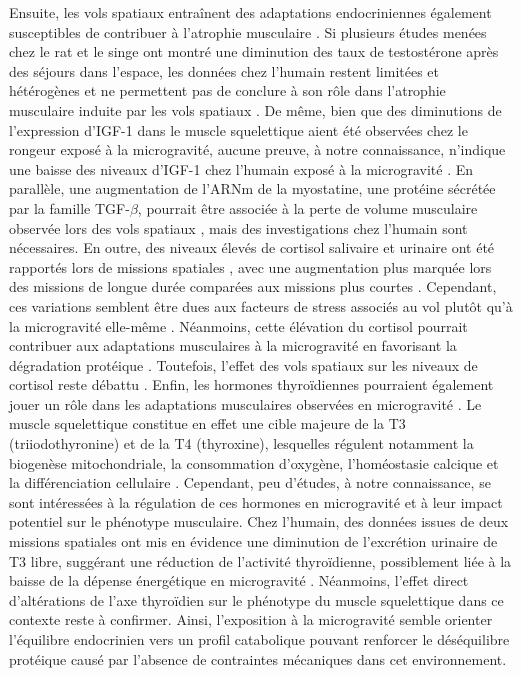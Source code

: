 \documentclass[11pt]{report}
\begin{document}
Ensuite, les vols spatiaux entraînent des adaptations endocriniennes également susceptibles de contribuer à l'atrophie musculaire \parencite{lee_factors_2022}. Si plusieurs études menées chez le rat et le singe ont montré une diminution des taux de testostérone après des séjours dans l'espace, les données chez l'humain restent limitées et hétérogènes et ne permettent pas de conclure à son rôle dans l'atrophie musculaire induite par les vols spatiaux \parencite{lee_factors_2022,strollo_aging-like_2021}. De même, bien que des diminutions de l'expression d'IGF-1 dans le muscle squelettique aient été observées chez le rongeur exposé à la microgravité, aucune preuve, à notre connaissance, n'indique une baisse des niveaux d'IGF-1 chez l'humain exposé à la microgravité \parencite{lee_factors_2022,juhl_update_2021}. En parallèle, une augmentation de l'ARNm de la myostatine, une protéine sécrétée par la famille TGF-$\beta$, pourrait être associée à la perte de volume musculaire observée lors des vols spatiaux \parencite{liu_mechanisms_2024}, mais des investigations chez l'humain sont nécessaires. En outre, des niveaux élevés de cortisol salivaire et urinaire ont été rapportés lors de missions spatiales \parencite{MiriamCapri2025Sep}, avec une augmentation plus marquée lors des missions de longue durée comparées aux missions plus courtes \parencite{Stowe2011Jun}. Cependant, ces variations semblent être dues aux facteurs de stress associés au vol plutôt qu'à la microgravité elle-même \parencite{strollo_aging-like_2021}. Néanmoins, cette élévation du cortisol pourrait contribuer aux adaptations musculaires à la microgravité en favorisant la dégradation protéique \parencite{Sato2017Jan}. Toutefois, l'effet des vols spatiaux sur les niveaux de cortisol reste débattu \parencite{lee_factors_2022}. Enfin, les hormones thyroïdiennes pourraient également jouer un rôle dans les adaptations musculaires observées en microgravité \parencite{lee_factors_2022}. Le muscle squelettique constitue en effet une cible majeure de la T3 (triiodothyronine) et de la T4 (thyroxine), lesquelles régulent notamment la biogenèse mitochondriale, la consommation d'oxygène, l'homéostasie calcique et la différenciation cellulaire \parencite{Salvatore2014Apr,Lombardi2015Aug,lee_factors_2022}. Cependant, peu d'études, à notre connaissance, se sont intéressées à la régulation de ces hormones en microgravité et à leur impact potentiel sur le phénotype musculaire. Chez l'humain, des données issues de deux missions spatiales ont mis en évidence une diminution de l'excrétion urinaire de T3 libre, suggérant une réduction de l'activité thyroïdienne, possiblement liée à la baisse de la dépense énergétique en microgravité \parencite{Stein1999Jan}. Néanmoins, l'effet direct d'altérations de l'axe thyroïdien sur le phénotype du muscle squelettique dans ce contexte reste à confirmer. Ainsi, l'exposition à la microgravité semble orienter l'équilibre endocrinien vers un profil catabolique pouvant renforcer le déséquilibre protéique causé par l'absence de contraintes mécaniques dans cet environnement. 
\end{document}
